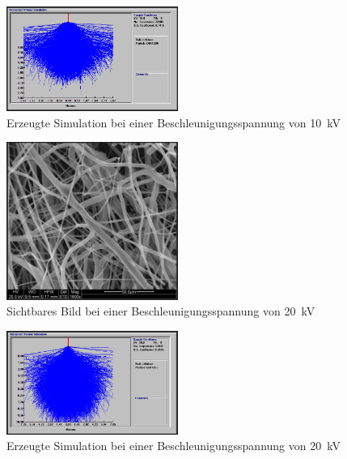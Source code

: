 \documentclass[12pt,english,ngerman]{scrartcl}
\begin{document}
\begin{figure}[H]
	\begin{center}
		\includegraphics[width =0.5\textwidth]{./figures/simulation10kv.png}
	\end{center}
	\caption{Erzeugte Simulation bei einer Beschleunigungsspannung von \SI{10}{\kilo\volt} \cite{sein_foto}}
    \label{fig:simulation10kv}
\end{figure}


\begin{figure}[H]
	\begin{center}
		\includegraphics[width =0.5\textwidth]{./figures/20kv.png}
	\end{center}
	\caption{Sichtbares Bild bei einer Beschleunigungsspannung von \SI{20}{\kilo\volt}}
    \label{fig:20kv}
\end{figure}

\begin{figure}[H]
	\begin{center}
		\includegraphics[width =0.5\textwidth]{./figures/simulation20kv.png}
	\end{center}
	\caption{Erzeugte Simulation bei einer Beschleunigungsspannung von \SI{20}{\kilo\volt} \cite{sein_foto}}
    \label{fig:simulation20kv}
\end{figure}
\end{document}
